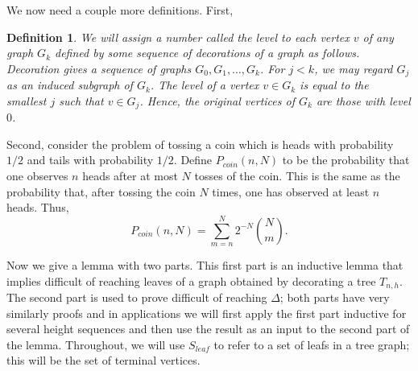 \documentclass[letterpaper,onecolumn]{quantumarticle}
\newtheorem{definition}{Definition}
\newcommand{\Pbias}{P_{coin}}
\begin{document}
We now need a couple more definitions.
First, 
\begin{definition}
We will assign a 
number called the {\it level} to each vertex $v$ of any graph $G_k$ defined by some sequence of decorations of a graph as follows.
Decoration gives a sequence of graphs $G_0,G_1,\ldots,G_k$.  For $j<k$, we may regard $G_j$ as an induced subgraph of $G_k$.
The level of a vertex $v\in G_k$ is equal to the smallest $j$ such that $v\in G_j$.
Hence, the original vertices of $G_k$ are those with level $0$.
\end{definition}

Second, consider the problem of tossing a coin which is heads with probability $1/2$ and tails with probability $1/2$.
Define $\Pbias(n,N)$ to be the probability that one observes $n$ heads after at most $N$ tosses of the coin.
This is the same as the probability that, after tossing the coin $N$ times, one has observed at least $n$ heads.
Thus,
$$\Pbias(n,N)=\sum_{m=n}^N 2^{-N} {N \choose m}.$$

Now we give a lemma with two parts.  This first part is an inductive lemma that implies difficult of reaching leaves of a graph obtained by decorating a tree $T_{n,h}$.  The second part is used to prove difficult of reaching $\Delta$; both parts have very similarly proofs and in applications we will first apply the first part inductive for several height sequences and then use the result as an input to the second part of the lemma.
Throughout, we will use $S_{leaf}$ to refer to a set of leafs in a tree graph; this will be the set of terminal vertices.
\end{document}
